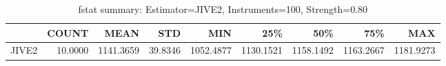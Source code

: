 \begin{table}[ht]
\centering
\caption{fstat summary: Estimator=JIVE2, Instruments=100, Strength=0.80}
\begin{tabular}{lrrrrrrrr}
\toprule
 & COUNT & MEAN & STD & MIN & 25\% & 50\% & 75\% & MAX \\
\midrule
JIVE2 & 10.0000 & 1141.3659 & 39.8346 & 1052.4877 & 1130.1521 & 1158.1492 & 1163.2667 & 1181.9273 \\
\bottomrule
\end{tabular}
\end{table}
